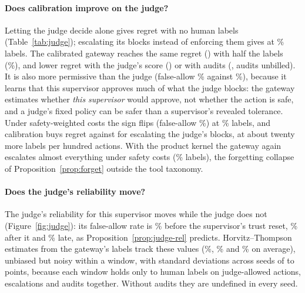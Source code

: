 \documentclass[11pt]{article}
\begin{document}
\paragraph{Does calibration improve on the judge?} Letting the judge decide
alone gives regret \jrJudgeOnlyRegret{} with no human labels
(Table~\ref{tab:judge}); escalating its blocks instead of enforcing them gives
\jrJudgeEscalateRegret{} at \jrJudgeEscalateLabels\% labels. The calibrated
gateway reaches the same regret (\jrCalibratedRegret) with half the labels
(\jrCalibratedLabels\%), and lower regret with the judge's score
(\jrCalibratedScoreRegret) or with audits (\jrCalibratedAuditRegret, audits
unbilled). It is also more permissive than the judge (false-allow
\jrCalibratedFA\% against \jrJudgeOnlyFA\%), because it learns that this
supervisor approves much of what the judge blocks: the gateway estimates
whether \emph{this supervisor} would approve, not whether the action is safe,
and a judge's fixed policy can be safer than a supervisor's revealed
tolerance. Under safety-weighted costs the sign flips (false-allow
\jrCalibratedSafeFA\%) at \jrCalibratedSafeLabels\% labels, and calibration
buys regret \jrCalibratedSafeRegret{} against \jrJudgeEscalateSafeRegret{}
for escalating the judge's blocks, at about twenty more labels per hundred
actions. With the product kernel the gateway again escalates almost
everything under safety costs (\jrCalibratedProductAuditSafeLabels\% labels),
the forgetting collapse of Proposition~\ref{prop:forget} outside the tool
taxonomy.

\paragraph{Does the judge's reliability move?} The judge's reliability for
this supervisor moves while the judge does not (Figure~\ref{fig:judge}): its
false-allow rate is \jrRelPreFATrue\% before the supervisor's trust reset,
\jrRelPostFATrue\% after it and \jrRelLateFATrue\% late, as
Proposition~\ref{prop:judge-rel} predicts. Horvitz--Thompson estimates from
the gateway's labels track these values (\jrRelPreFAEst\%,
\jrRelPostFAEst\% and \jrRelLateFAEst\% on average), unbiased but noisy
within a window, with standard deviations across seeds of \jrRelPreFASd{} to
\jrRelPostFASd{} points, because each window holds only \jrRelPreLabels{} to
\jrRelPostLabels{} human labels on judge-allowed actions, escalations and
audits together. Without audits they are undefined in every seed.
\end{document}
